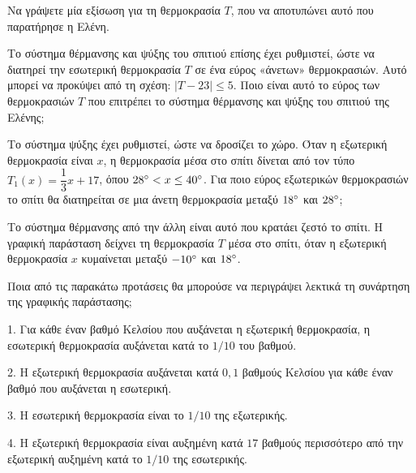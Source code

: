 \begin{alist}
\item Να γράψετε μία εξίσωση για τη θερμοκρασία $T$, που να αποτυπώνει αυτό που παρατήρησε η Ελένη.
\item Το σύστημα θέρμανσης και ψύξης του σπιτιού επίσης έχει ρυθμιστεί, ώστε να διατηρεί την εσωτερική θερμοκρασία $T$ σε ένα εύρος «άνετων» θερμοκρασιών. Αυτό μπορεί να προκύψει από τη σχέση:
$|T - 23| \leq 5$.
Ποιο είναι αυτό το εύρος των θερμοκρασιών $T$ που επιτρέπει το σύστημα θέρμανσης και ψύξης του σπιτιού της Ελένης;
\item Το σύστημα ψύξης έχει ρυθμιστεί, ώστε να δροσίζει το χώρο. Όταν η εξωτερική θερμοκρασία είναι $x$, η θερμοκρασία μέσα στο σπίτι δίνεται από τον τύπο $T_1(x) = \dfrac{1}{3}x + 17$, όπου $28\degree < x \leq 40\degree$. Για ποιο εύρος εξωτερικών θερμοκρασιών το σπίτι θα διατηρείται σε μια άνετη θερμοκρασία μεταξύ $18\degree$ και $28\degree$;

\begin{center}
\end{center}

\item Το σύστημα θέρμανσης από την άλλη είναι αυτό που κρατάει ζεστό το σπίτι. Η γραφική παράσταση δείχνει τη θερμοκρασία $T$ μέσα στο σπίτι, όταν η εξωτερική θερμοκρασία $x$ κυμαίνεται μεταξύ $-10\degree$ και $18\degree$.

Ποια από τις παρακάτω προτάσεις θα μπορούσε να περιγράψει λεκτικά τη συνάρτηση της γραφικής παράστασης;

1. Για κάθε έναν βαθμό Κελσίου που αυξάνεται η εξωτερική θερμοκρασία, η εσωτερική θερμοκρασία αυξάνεται κατά το $1/10$ του βαθμού.

2. Η εξωτερική θερμοκρασία αυξάνεται κατά $0{,}1$ βαθμούς Κελσίου για κάθε έναν βαθμό που αυξάνεται η εσωτερική.

3. Η εσωτερική θερμοκρασία είναι το $1/10$ της εξωτερικής.

4. Η εξωτερική θερμοκρασία είναι αυξημένη κατά $17$ βαθμούς περισσότερο από την εξωτερική αυξημένη κατά το $1/10$ της εσωτερικής.

\end{alist}

